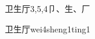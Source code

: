 \begin{entry}{卫生厅}{3,5,4}{⼙、⽣、⼚}
  \begin{phonetics}{卫生厅}{wei4sheng1ting1}
  \end{phonetics}
\end{entry}
